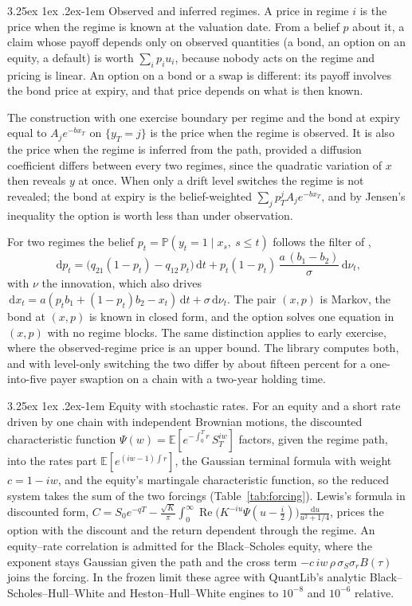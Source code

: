 \documentclass[11pt]{article}
\makeatletter
\renewcommand\paragraph{\@startsection{paragraph}{4}{\z@}%
  {3.25ex \@plus1ex \@minus.2ex}{-1em}%
  {\normalfont\normalsize\itshape}}
\theoremstyle{remark}
\newcommand{\E}{\mathbb{E}}
\newcommand{\dd}{\,\mathrm{d}}
\newcommand{\ql}{\textsf{QuantLib}}
\makeatother
\begin{document}
\paragraph{Observed and inferred regimes.}
A price in regime $i$ is the price when the regime is known at the valuation date. From a belief $p$ about it, a
claim whose payoff depends only on observed quantities (a bond, an option on an equity, a default) is worth
$\sum_i p_i u_i$, because nobody acts on the regime and pricing is linear. An option on a bond or a swap is
different: its payoff involves the bond price at expiry, and that price depends on what is then known.

The construction with one exercise boundary per regime and the bond at expiry equal to $A_j e^{-b x_T}$ on
$\{y_T = j\}$ is the price when the regime is observed. It is also the price when the regime is inferred from the
path, provided a diffusion coefficient differs between every two regimes, since the quadratic variation of $x$ then
reveals $y$ at once. When only a drift level switches the regime is not revealed; the bond at expiry is the
belief-weighted $\sum_j p^j_T A_j e^{-b x_T}$, and by Jensen's inequality the option is worth less than under
observation.

For two regimes the belief $p_t = \mathbb{P}(y_t = 1 \mid x_s,\ s \le t)$ follows the filter of
\citet{wonham1965},
\[
  \dd p_t = \big(q_{21}(1 - p_t) - q_{12}\,p_t\big)\dd t + p_t(1 - p_t)\,\frac{a\,(b_1 - b_2)}{\sigma}\dd\nu_t,
\]
with $\nu$ the innovation, which also drives $\dd x_t = a(p_t b_1 + (1 - p_t)b_2 - x_t)\dd t + \sigma\dd\nu_t$. The
pair $(x, p)$ is Markov, the bond at $(x, p)$ is known in closed form, and the option solves one equation in
$(x, p)$ with no regime blocks. The same distinction applies to early exercise, where the observed-regime price is
an upper bound. The library computes both, and with level-only switching the two differ by about fifteen percent
for a one-into-five payer swaption on a chain with a two-year holding time.

\paragraph{Equity with stochastic rates.}
For an equity and a short rate driven by one chain with independent Brownian motions, the discounted
characteristic function $\Psi(w) = \E[e^{-\int_0^T r}\,S_T^{iw}]$ factors, given the regime path, into the rates
part $\E[e^{(iw - 1)\int r}]$, the Gaussian terminal formula with weight $c = 1 - iw$, and the equity's
martingale characteristic function, so the reduced system takes the sum of the two forcings
(Table~\ref{tab:forcing}). Lewis's formula in discounted form,
$C = S_0e^{-qT} - \frac{\sqrt K}{\pi}\int_0^\infty \operatorname{Re}\big(K^{-iu}\Psi(u - \tfrac i2)\big)\frac{\dd u}{u^2 + 1/4}$,
prices the option with the discount and the return dependent through the regime. An equity--rate correlation is
admitted for the Black--Scholes equity, where the exponent stays Gaussian given the path and the cross term
$-c\,iw\,\rho\,\sigma_S\sigma_r B(\tau)$ joins the forcing. In the frozen limit these agree with \ql{}'s analytic
Black--Scholes--Hull--White and Heston--Hull--White engines to $10^{-8}$ and $10^{-6}$ relative.
\end{document}
